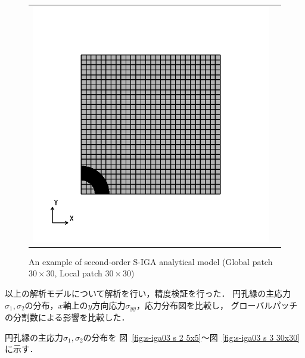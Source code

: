 \begin{figure}[htbp]
\begin{tabular}{cc}
\begin{minipage}[t]{0.45\hsize}
      \includegraphics[keepaspectratio, scale=0.3]
      {fig/result_data_etc/s-iga03/model/30x30.png}
      \caption{An example of second-order S-IGA analytical model (Global patch $30\times 30$, Local patch $30\times 30$)}
      \label{fig:s-iga03 model04}
    \end{minipage}
  \end{tabular}
\end{figure}

\noindent
以上の解析モデルについて解析を行い，精度検証を行った．
円孔縁の主応力$\sigma_1, \sigma_2$の分布，$x$軸上の$y$方向応力$\sigma_{yy}$，応力分布図を比較し，
グローバルパッチの分割数による影響を比較した．

円孔縁の主応力$\sigma_1, \sigma_2$の分布を
図~\ref{fig:s-iga03 s 2 5x5}～図~\ref{fig:s-iga03 s 3 30x30}に示す．

